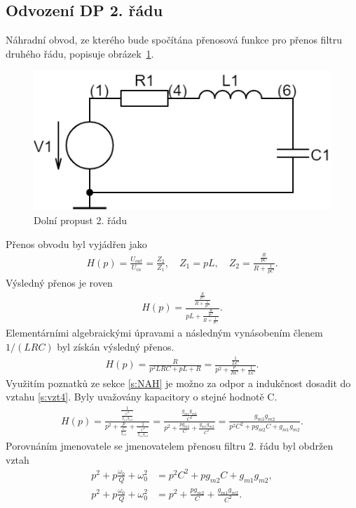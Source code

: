 \subsection{Odvození DP 2. řádu}\label{s:ODV}
\noindent Náhradní obvod, ze kterého bude spočítána přenosová funkce pro přenos filtru druhého řádu, popisuje obrázek~\ref{s:DPO}.
\begin{figure}[h]
\centering
\includegraphics[scale=0.4]{circuit(2).png}
\caption{Dolní propust 2. řádu \label{s:DPO}} 
\end{figure}
\noindent Přenos obvodu byl vyjádřen jako
\begin{align}
H(p) = \frac{U_{out}}{U_{in}} = \frac{Z_2}{Z_1}, \quad Z_1 = pL,\quad Z_2 = \frac{\frac{R}{pC}}{R + \frac{1}{pC}}.
\end{align}
Výsledný přenos je roven 
\begin{align}
H(p) = \frac{\frac{\frac{R}{pC}}{R + \frac{1}{pC}}}{pL + \frac{\frac{R}{pC}}{R + \frac{1}{pC}}}.
\end{align}
Elementárními algebraickými úpravami a následným vynásobením členem $1/(LRC)$ byl získán výsledný přenos.
\begin{align}\label{s:vzt4}
H(p) = \frac{R}{p^2LRC + pL + R} = \frac{\frac{1}{LC}}{p^2 + \frac{p}{RC} + \frac{1}{LC}}.
\end{align}
\noindent Využitím poznatků ze sekce \ref{s:NAH} je možno za odpor a indukčnost dosadit do vztahu \ref{s:vzt4}. Byly uvažovány kapacitory o stejné hodnotě C.
\begin{align}
H(p) = \frac{\frac{1}{\frac{C^2}{g_{m1}g_{m2}}}}{p^2 + \frac{p}{\frac{C}{g_{m2}}} + \frac{1}{\frac{C^2}{g_{m1}g_{m2}}}} = \frac{\frac{g_{m1}g_{m2}}{C^2}}{p^2 + \frac{pg_{m2}}{C} + \frac{g_{m1}g_{m2}}{C^2}} = \frac{g_{m1}g_{m2}}{p^2C^2 + pg_{m2}C + g_{m1}g_{m2}}.
\end{align}
Porovnáním jmenovatele se jmenovatelem přenosu filtru 2. řádu byl obdržen vztah
\begin{align}
p^2 + p\frac{\omega _0}{Q} + \omega _0^2 &= p^2C^2 + pg_{m2}C + g_{m1}g_{m2},\\
p^2 + p\frac{\omega _0}{Q} + \omega _0^2 &= p^2 + \frac{pg_{m2}}{C} + \frac{g_{m1}g_{m2}}{C^2}.
\end{align}
